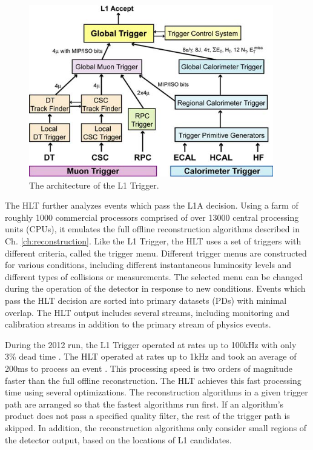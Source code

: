 \begin{figure}[hbt]
\begin{center}
\includegraphics[width=0.95\textwidth]{figures/L1_architecture.png}
\caption{The architecture of the L1 Trigger.}
\label{fig:L1-trigger}
\end{center}
\end{figure}

The HLT further analyzes events which pass the L1A decision. Using a farm of roughly 1000 commercial processors comprised of over 13000 central processing units (CPUs), it emulates the full offline reconstruction algorithms described in Ch. \ref{ch:reconstruction}. Like the L1 Trigger, the HLT uses a set of triggers with different criteria, called the trigger menu. Different trigger menus are constructed for various conditions, including different instantaneous luminosity levels and different types of collisions or measurements. The selected menu can be changed during the operation of the detector in response to new conditions. Events which pass the HLT decision are sorted into primary datasets (PDs) with minimal overlap. The HLT output includes several streams, including monitoring and calibration streams in addition to the primary stream of physics events.

During the 2012 run, the L1 Trigger operated at rates up to 100\unit{kHz} with only 3\% dead time \cite{Brooke:2013hnf}. The HLT operated at rates up to 1\unit{kHz} and took an average of 200\unit{ms} to process an event \cite{Trocino:2014jya}. This processing speed is two orders of magnitude faster than the full offline reconstruction. The HLT achieves this fast processing time using several optimizations. The reconstruction algorithms in a given trigger path are arranged so that the fastest algorithms run first. If an algorithm's product does not pass a specified quality filter, the rest of the trigger path is skipped. In addition, the reconstruction algorithms only consider small regions of the detector output, based on the locations of L1 candidates.

